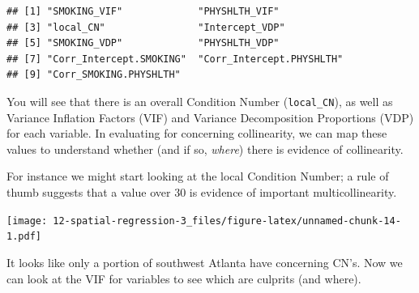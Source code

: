 \documentclass[
]{book}
\newenvironment{Shaded}{\begin{snugshade}}{\end{snugshade}}
\newcommand{\AttributeTok}[1]{\textcolor[rgb]{0.77,0.63,0.00}{#1}}
\newcommand{\DecValTok}[1]{\textcolor[rgb]{0.00,0.00,0.81}{#1}}
\newcommand{\FloatTok}[1]{\textcolor[rgb]{0.00,0.00,0.81}{#1}}
\newcommand{\FunctionTok}[1]{\textcolor[rgb]{0.00,0.00,0.00}{#1}}
\newcommand{\NormalTok}[1]{#1}
\newcommand{\SpecialCharTok}[1]{\textcolor[rgb]{0.00,0.00,0.00}{#1}}
\newcommand{\StringTok}[1]{\textcolor[rgb]{0.31,0.60,0.02}{#1}}
\begin{document}
\begin{verbatim}
## [1] "SMOKING_VIF"             "PHYSHLTH_VIF"           
## [3] "local_CN"                "Intercept_VDP"          
## [5] "SMOKING_VDP"             "PHYSHLTH_VDP"           
## [7] "Corr_Intercept.SMOKING"  "Corr_Intercept.PHYSHLTH"
## [9] "Corr_SMOKING.PHYSHLTH"
\end{verbatim}

You will see that there is an overall Condition Number (\texttt{local\_CN}), as well as Variance Inflation Factors (VIF) and Variance Decomposition Proportions (VDP) for each variable. In evaluating for concerning collinearity, we can map these values to understand whether (and if so, \emph{where}) there is evidence of collinearity.

For instance we might start looking at the local Condition Number; a rule of thumb suggests that a value over 30 is evidence of important multicollinearity.

\begin{Shaded}
\end{Shaded}

\texttt{[image: 12-spatial-regression-3\_files/figure-latex/unnamed-chunk-14-1.pdf]}

It looks like only a portion of southwest Atlanta have concerning CN's. Now we can look at the VIF for variables to see which are culprits (and where).

\begin{Shaded}
\end{Shaded}
\end{document}
